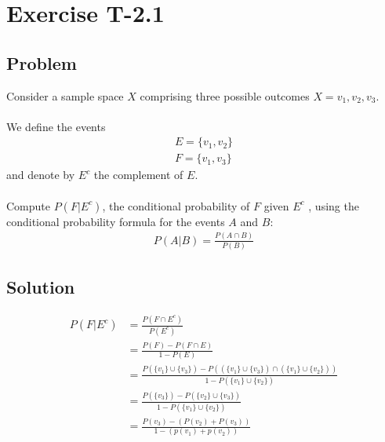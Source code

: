 \section*{Exercise T-2.1}

\subsection*{Problem}
Consider a sample space $X$ comprising three possible outcomes $X = {v_1, v_2, v_3}$.\\ \\
We define the events
\begin{align}
	E = \{v_1,v_2\} \nonumber \\
	F = \{v_1,v_3\}\nonumber 
\end{align}
and denote by $E^c$ the complement of $E$.\\ \\
Compute $P(F|E^c)$, the conditional probability of $F$ given $E^c$ , using the conditional
probability formula for the events $A$ and $B$:\\

\begin{align}
P(A|B)=  \frac{P(A \cap B)}{P(B)} \nonumber 
\end{align}


\subsection*{Solution}

\begin{align}
	P(F|E^c) &= \frac{P(F\cap E^c)}{P(E^c)} \nonumber \\
	&= \frac{P(F) - P(F \cap E)}{1 - P(E)} \nonumber \\
	&= \frac{P( \{v_1\} \cup \{v_3\} ) - P(( \{v_1\} \cup \{v_3\} ) \cap (\{v_1\} \cup \{v_2\}))}{1 - P(\{v_1\} \cup \{v_2\})} \nonumber \\
	&= \frac{P( \{v_3\} ) - P(\{v_2\} \cup \{v_3\})}{1 - P(\{v_1\} \cup \{v_2\})} \nonumber \\
	&= \frac{P(v_3) - (P(v_2)+ P(v_3))}{1-(p(v_1)+p(v_2))}\nonumber\\
\end{align}
